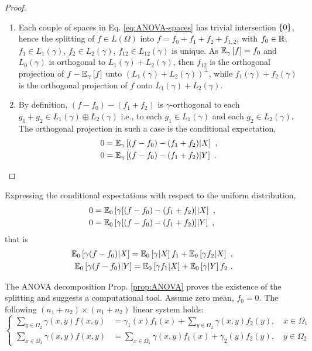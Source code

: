 \documentclass[runningheads]{llncs}
\begin{document}
\begin{proof}
\begin{enumerate}
\item Each couple of spaces in Eq. \eqref{eq:ANOVA-spaces} has trivial intersection $\left\{ 0 \right\}$, hence the splitting of $f \in L(\Omega)$ into $f = f_0 + f_1 + f_2 + f_{1,2}$, with $f_0 \in \mathbb R$, $f_1 \in L_1(\gamma)$, $f_2 \in L_2(\gamma)$, $f_{12} \in L_{12}(\gamma)$ is unique. As ${\operatorname{\mathbb E}}_{\gamma}\left[f\right] = f_0$ and $L_0(\gamma)$ is orthogonal to $L_1(\gamma)+L_2(\gamma)$, then $f_{12}$ is the orthogonal projection of $f - {\operatorname{\mathbb E}}_{\gamma}\left[f\right]$ unto $(L_1(\gamma)+L_2(\gamma))^\perp$, while $f_1(\gamma)+f_2(\gamma)$ is the orthogonal projection of $f$ onto $L_1(\gamma)+L_2(\gamma)$.
\item By definition, $(f - f_0) - (f_1 + f_2)$ is $\gamma$-orthogonal to each $g_1+g_2 \in L_1(\gamma)\oplus L_2(\gamma)$ i.e., to each $g_1 \in L_1(\gamma)$ and each $g_2 \in L_2(\gamma)$. The orthogonal projection in such a case is the conditional expectation,
%
  \begin{align*}
    0 &= {\operatorname{\mathbb E}}_{\gamma}\left[(f-f_0) - (f_1+f_2) \middle| X\right]  \ , \\
   0 &= {\operatorname{\mathbb E}}_{\gamma}\left[(f-f_0) - (f_1+f_2) \middle| Y\right] \ .
  \end{align*}
\end{enumerate}
\end{proof}

Expressing the conditional expectations with respect to the uniform distribution,
%
  \begin{align*}
    0 &= {\operatorname{\mathbb E}}_{0}\left[\gamma[(f-f_0) - (f_1+f_2)] \middle| X\right] \ , \\
   0 &= {\operatorname{\mathbb E}}_{0}\left[\gamma[(f-f_0) - (f_1+f_2)] \middle| Y\right] \ ,
  \end{align*}
that is
%
  \begin{align*}
  {\operatorname{\mathbb E}}_{0}\left[\gamma(f-f_0) \middle| X\right] =  {\operatorname{\mathbb E}}_{0}\left[\gamma \middle| X\right] f_1 + {\operatorname{\mathbb E}}_{0}\left[\gamma f_2 \middle| X\right] \ , \\
    {\operatorname{\mathbb E}}_{0}\left[\gamma(f-f_0) \middle| Y\right] =  {\operatorname{\mathbb E}}_{0}\left[\gamma f_1 \middle| X\right]  + {\operatorname{\mathbb E}}_{0}\left[\gamma \middle| Y\right] f_2\ .
  \end{align*}

The ANOVA decomposition Prop. \ref{prop:ANOVA} proves the existence of the splitting and suggests a computational tool. Assume zero mean, $f_0=0$. The following $(n_1+n_2)\times(n_1+n_2)$ linear system holds:
%
\begin{equation*}
\begin{cases}
  \sum_{y \in \Omega_2} \gamma(x,y)f(x,y) &= \gamma_1(x) f_1(x) + \sum_{y \in \Omega_2} \gamma(x,y) f_2(y) , \quad x \in \Omega_1 \\
  \sum_{x \in \Omega_1} \gamma(x,y)f(x,y) &= \sum_{x \in \Omega_1} \gamma(x,y) f_1(x)  + \gamma_2(y)f_2(y) , \quad y \in \Omega_2
\end{cases}
\end{equation*}
%
\end{document}
